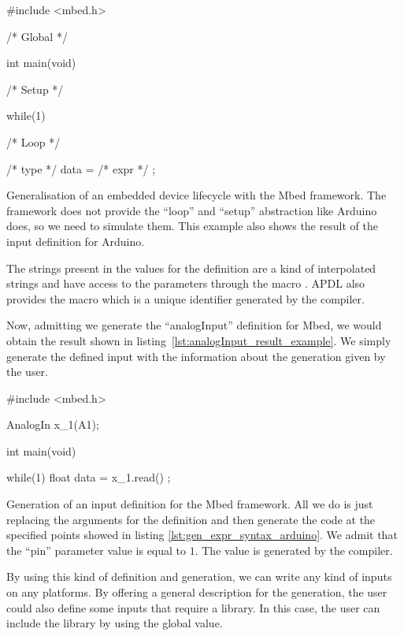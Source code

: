 \begin{listing}[H]
  \centering
\begin{cppcode}
#include <mbed.h>

/* Global */

int main(void){
  /* Setup */

  while(1){
    /* Loop */
    
    /* type */ data = /* expr */ ;
  }
}
\end{cppcode}
  \caption[Generalisation of an embedded device lifecycle with
Mbed]{Generalisation of an embedded device lifecycle with the Mbed framework.
The framework does not provide the ``loop'' and ``setup'' abstraction like
Arduino does, so we need to simulate them. This example also shows the result of
the input definition for Arduino.}
  \label{lst:gen_expr_syntax_mbed}
\end{listing}

The strings present in the values for the  definition are a kind
of interpolated strings and have access to the parameters through the macro
. \gls{APDL} also provides the macro
 which is a unique identifier generated by the compiler.

Now, admitting we generate the ``analogInput'' definition for Mbed, we would
obtain the result shown in listing~\ref{lst:analogInput_result_example}. We
simply generate the defined input with the information about the generation
given by the user.

\begin{listing}[H]
  \centering
\begin{cppcode}
#include <mbed.h>

AnalogIn x_1(A1);

int main(void){

  while(1){
    float data = x_1.read() ;
  }
}
\end{cppcode}
  \caption[Generation of an input definition for Mbed]{Generation of an input
definition for the Mbed framework. All we do is just replacing the arguments
for the definition and then generate the code at the specified points showed
in listing \ref{lst:gen_expr_syntax_arduino}. We admit that the ``pin''
parameter value is equal to $1$. The  value is generated by the
compiler.}
  \label{lst:analogInput_result_example}
\end{listing}

By using this kind of definition and generation, we can write any kind of inputs
on any platforms. By offering a general description for the generation, the user
could also define some inputs that require a library. In this case, the user can include
the library by using the global value.

